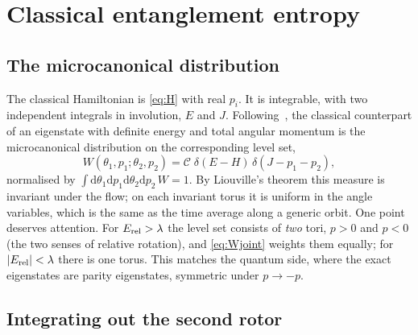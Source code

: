 \documentclass[preprint,12pt]{elsarticle}
\newcommand{\dd}{\mathrm{d}}
\newcommand{\Erel}{E_{\rm rel}}
\begin{document}
\section{Classical entanglement entropy}
\label{sec:classical}

\subsection{The microcanonical distribution}

The classical Hamiltonian is \eqref{eq:H} with real $p_{i}$. It is integrable,
with two independent integrals in involution, $E$ and $J$. Following~\cite{DKS},
the classical counterpart of an eigenstate with definite energy and total
angular momentum is the microcanonical distribution on the corresponding level
set,
\begin{equation}
W(\theta_{1},p_{1};\theta_{2},p_{2})=\mathcal{C}\;
\delta\!\left(E-H\right)\,\delta\!\left(J-p_{1}-p_{2}\right),
\label{eq:Wjoint}
\end{equation}
normalised by $\int\dd\theta_{1}\dd p_{1}\dd\theta_{2}\dd p_{2}\,W=1$. By
Liouville's theorem this measure is invariant under the flow; on each invariant
torus it is uniform in the angle variables, which is the same as the time
average along a generic orbit. One point deserves attention. For
$\Erel>\lambda$ the level set consists of \emph{two} tori, $p>0$ and $p<0$
(the two senses of relative rotation), and \eqref{eq:Wjoint} weights them
equally; for $|\Erel|<\lambda$ there is one torus. This matches the quantum
side, where the exact eigenstates are parity eigenstates, symmetric under
$p\to-p$.

\subsection{Integrating out the second rotor}
\end{document}
